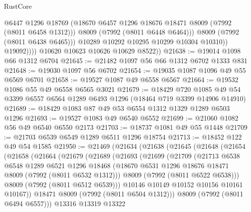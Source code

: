 \begin{lexlean}{RustCore}
\begin{coremodule}
                        @6447
                        @1296
                        @18769
                        (@18670 @6457 @1296 @18676 @18471 @8009 (@7992 (@8011 @6458 @1312)))
                        @8009
                        (@7992 (@8011 @6448 @6464)))
                      @8009
                      (@7992 (@8011 @6438 @6465)))
                    @10289
                    @10292
                    @10295
                    @10299
                    @10304
                    @10310))
                @19092))))
        @10620
        @10623
        @10626
        @10629
        @8522))
@21638 := @19014 @1098 @66 @1312 @6704
@21645 := @21482 @1097 @56 @66 @1312 @6702 @1333 @831
@21648 := @19030 @1097 @56 @6702
@21654 := @19035 @1087 @1096 @49 @55 @6569 @6701
@21658 := @19527 @1087 @49 @6558 @6567
@21664 := @19532 @1086 @55 @49 @6558 @6565 @3021
@21679 := @18429
    @720
    @1085
    @49
    @54
    @3399
    @6557
    @6564
    @1289
    @6493
    @1296
    (@18464 @719 @3399 @14906 @14910)
@21689 := @18429 @1083 @87 @49 @53 @6554 @1312 @1329 @1289 @6503 @1296
@21693 := @19527 @1083 @49 @6540 @6552
@21699 := @21060 @1082 @56 @49 @6540 @6550 @2173
@21703 := @18737 @1081 @49 @55 @1448
@21709 := @21703 @6539 @6549 @1289 @6511 @1296 @18754
@21713 := @18452 @122 @49 @54 @1585
@21950 := @21469
    (@21634
      (@21638
        (@21645
          (@21648
            (@21654
              (@21658
                (@21664
                  (@21679
                    (@21689
                      (@21693
                        (@21699
                          (@21709
                            (@21713
                              @6538
                              @6548
                              @1289
                              @6521
                              @1296
                              @18468
                              (@18670 @6531 @1296 @18676 @18471 @8009 (@7992 (@8011 @6532 @1312)))
                              @8009
                              (@7992 (@8011 @6522 @6538)))
                            @8009
                            (@7992 (@8011 @6512 @6539)))
                          @10146
                          @10149
                          @10152
                          @10156
                          @10161
                          @10167))
                      @18471
                      @8009
                      (@7992 (@8011 @6504 @1312)))
                    @8009
                    (@7992 (@8011 @6494 @6557)))
                  @13316
                  @13319
                  @13322

\end{coremodule}
\end{lexlean}
